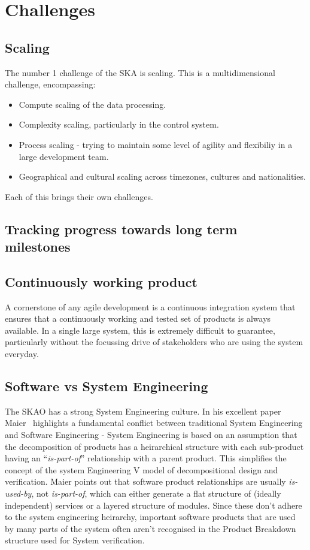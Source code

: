 \documentclass[a4paper,
               biblatex,     %
               keeplastbox,   %
               ]{jacow}
\begin{document}
\section{Challenges}
\subsection{Scaling}
The number 1 challenge of the SKA is scaling. This is a multidimensional challenge, encompassing:
\begin{itemize}
	\item Compute scaling of the data processing.
	\item Complexity scaling, particularly in the control system.
	\item Process scaling - trying to maintain some level of agility and flexibiliy in a large development team.
	\item Geographical and cultural scaling across timezones, cultures and nationalities.
\end{itemize}
Each of this brings their own challenges.

\subsection{Tracking progress towards long term milestones}
\subsection{Continuously working product}
A cornerstone of any agile development is a continuous integration system that ensures that a continuously  working and tested set of products is always available. In a single large system, this is extremely difficult to guarantee, particularly without the focussing drive of stakeholders who are using the system everyday.

\subsection{Software vs System Engineering}
The SKAO has a strong System Engineering culture. In his excellent paper Maier~\cite{Maier2006} highlights a fundamental conflict between traditional System Engineering and Software Engineering - System Engineering is based on an assumption that the decomposition of products has a heirarchical structure with each sub-product having an ``{\em is-part-of}'' relationship with a parent product. This simplifies the concept of the system Engineering V model of decompositional design and verification. Maier points out that software product relationships are usually {\em is-used-by}, not {\em is-part-of}, which can either generate a flat structure of (ideally independent) services or a layered structure of modules. Since these don't adhere to the system engineering heirarchy, important software products that are used by many parts of the system often aren't recognised in the Product Breakdown structure used for System verification.
\end{document}
